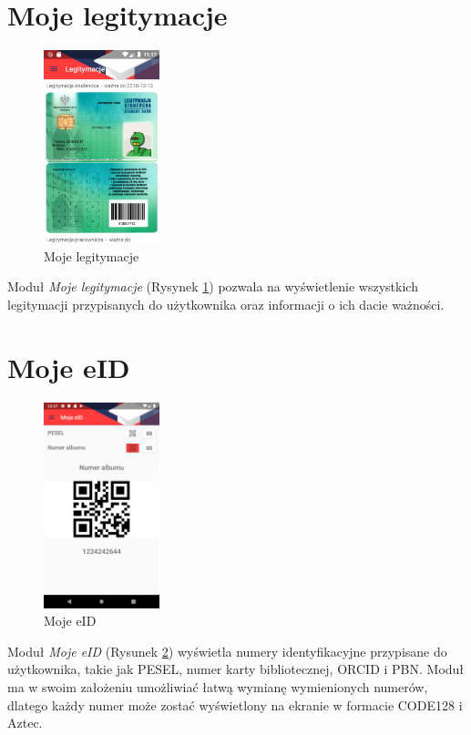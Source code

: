 \documentclass{pracamgr}
\begin{document}
\section{Moje legitymacje}

\begin{figure}[p]
	\centering
	\includegraphics[width=0.3\textwidth]{img/idcards.png}
	\caption{Moje legitymacje}\label{fig:idcards}
	\medskip
\end{figure}

Moduł \textit{Moje legitymacje} (Rysynek \ref{fig:idcards}) pozwala na wyświetlenie
wszystkich legitymacji przypisanych do użytkownika oraz informacji o ich dacie ważności.

\section{Moje eID}

\begin{figure}[p]
	\centering
	\includegraphics[width=0.3\textwidth]{img/myeid.png}
	\caption{Moje eID}\label{fig:myeid}
	\medskip
\end{figure}

Moduł \textit{Moje eID} (Rysunek \ref{fig:myeid}) wyświetla numery identyfikacyjne przypisane do użytkownika, takie jak
PESEL, numer karty bibliotecznej, ORCID i PBN. Moduł ma w swoim założeniu umożliwiać
łatwą wymianę wymienionych numerów, dlatego każdy numer może zostać wyświetlony na
ekranie w formacie CODE128 i Aztec.
\end{document}
